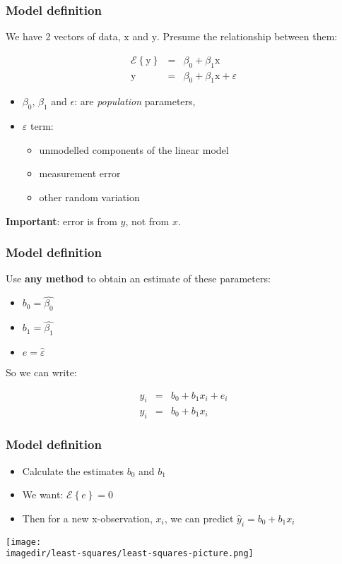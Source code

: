 \begin{frame}\frametitle{Model definition}

	We have 2 vectors of data, $\mathrm{x}$ and $\mathrm{y}$. Presume the relationship between them:

	$$
	\begin{array}{rcl}
		\mathcal{E}\left\{\mathrm{y}\right\} &=& \beta_0 + \beta_1 \mathrm{x} \\
		\mathrm{y} &=& \beta_0 + \beta_1 \mathrm{x} + \varepsilon
	\end{array}
	$$
	\begin{itemize}
		\item	$\beta_0$, $\beta_1$ and $\epsilon$: are \emph{population} parameters,
		\item	$\varepsilon$ term:
		\begin{itemize}
			\item	unmodelled components of the linear model
			\item	measurement error
			\item	other random variation
		\end{itemize}
	\end{itemize}

	\textbf{Important}: error is from $y$, not from $x$.
\end{frame}

\begin{frame}\frametitle{Model definition}

	Use \textbf{any method} to obtain an estimate of these parameters:
	\begin{itemize}
		\item	$b_0 = \hat{\beta_0}$
		\item	$b_1 = \hat{\beta_1}$
		\item	$e = \hat{\varepsilon}$
	\end{itemize}

	So we can write:

	$$
	\begin{array}{rcl}
		y_i &=& b_0 + b_1 x_i + e_i \\
		\hat{y}_i &=& b_0 + b_1 x_i
	\end{array}
	$$
\end{frame}

\begin{frame}\frametitle{Model definition}
	\begin{itemize}
		\item	Calculate the estimates $b_0$ and $b_1$
		\item	We want: $\mathcal{E}\left\{e\right\} = 0$
		\item	Then for a new x-observation, $x_i$, we can predict $\hat{y}_i =b_0 + b_1x_{i}$
	\end{itemize}
	\begin{center}
		\texttt{[image: \\imagedir/least-squares/least-squares-picture.png]}
	\end{center}
\end{frame}

